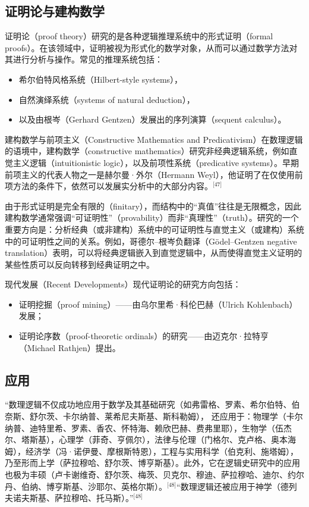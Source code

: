 \subsection{证明论与建构数学}
证明论（proof theory）研究的是各种逻辑推理系统中的形式证明（formal proofs）。在该领域中，证明被视为形式化的数学对象，从而可以通过数学方法对其进行分析与操作。常见的推理系统包括：
\begin{itemize}
  \item 希尔伯特风格系统（Hilbert-style systems），
  \item 自然演绎系统（systems of natural deduction），
  \item 以及由根岑（Gerhard Gentzen）发展出的序列演算（sequent calculus）。
\end{itemize}
建构数学与前项主义（Constructive Mathematics and Predicativism）在数理逻辑的语境中，建构数学（constructive mathematics）研究非经典逻辑系统，例如直觉主义逻辑（intuitionistic logic），以及前项性系统（predicative systems）。早期前项主义的代表人物之一是赫尔曼·外尔（Hermann Weyl），他证明了在仅使用前项方法的条件下，依然可以发展实分析中的大部分内容。\(^\text{[47]}\)

由于形式证明是完全有限的（finitary），而结构中的“真值”往往是无限概念，因此建构数学通常强调“可证明性”（provability）而非“真理性”（truth）。研究的一个重要方向是：分析经典（或非建构）系统中的可证明性与直觉主义（或建构）系统中的可证明性之间的关系。例如，哥德尔–根岑负翻译（Gödel–Gentzen negative translation）表明，可以将经典逻辑嵌入到直觉逻辑中，从而使得直觉主义证明的某些性质可以反向转移到经典证明之中。

现代发展（Recent Developments）现代证明论的研究方向包括：
\begin{itemize}
  \item 证明挖掘（proof mining）——由乌尔里希·科伦巴赫（Ulrich Kohlenbach）发展；
  \item 证明论序数（proof-theoretic ordinals）的研究——由迈克尔·拉特亨（Michael Rathjen）提出。
\end{itemize}
\subsection{应用}
“数理逻辑不仅成功地应用于数学及其基础研究（如弗雷格、罗素、希尔伯特、伯奈斯、舒尔茨、卡尔纳普、莱希尼夫斯基、斯科勒姆），  
还应用于：物理学（卡尔纳普、迪特里希、罗素、香农、怀特海、赖欣巴赫、费弗里耶），生物学（伍杰尔、塔斯基），心理学（菲奇、亨佩尔），法律与伦理（门格尔、克卢格、奥本海姆），经济学（冯·诺伊曼、摩根斯特恩），工程与实用科学（伯克利、施塔姆），乃至形而上学（萨拉穆哈、舒尔茨、博亨斯基）。此外，它在逻辑史研究中的应用也极为丰硕（卢卡谢维奇、舒尔茨、梅茨、贝克尔、穆迪、萨拉穆哈、迪尔、约尔丹、伯纳、博亨斯基、沙耶尔、英格尔斯）。\(^\text{[48]}\)“数理逻辑还被应用于神学（德列夫诺夫斯基、萨拉穆哈、托马斯）。”\(^\text{[48]}\)
